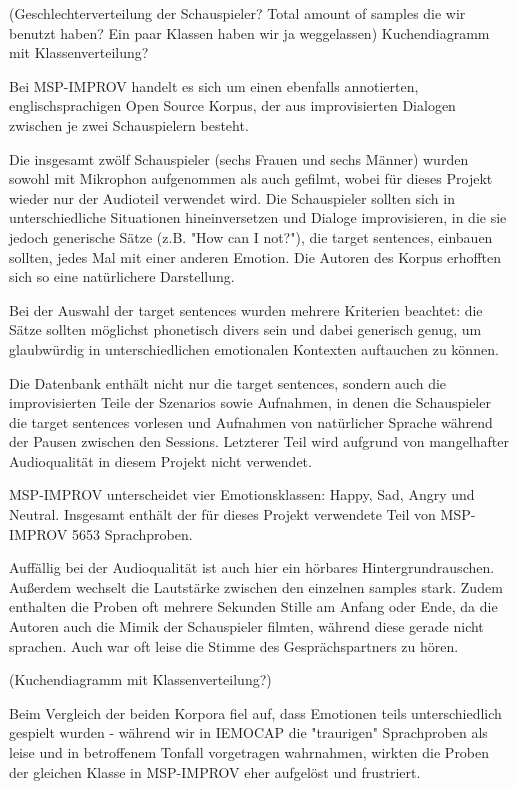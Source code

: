 \documentclass{article} %
\begin{document}
(Geschlechterverteilung der Schauspieler? Total amount of samples die wir benutzt haben? Ein paar Klassen haben wir ja weggelassen)
Kuchendiagramm mit Klassenverteilung?



Bei MSP-IMPROV handelt es sich um einen ebenfalls annotierten, englischsprachigen Open Source Korpus, der aus improvisierten Dialogen zwischen je zwei Schauspielern besteht. 

Die insgesamt zwölf Schauspieler (sechs Frauen und sechs Männer) wurden sowohl mit Mikrophon aufgenommen als auch gefilmt, wobei für dieses Projekt wieder nur der Audioteil verwendet wird. Die Schauspieler sollten sich in unterschiedliche Situationen hineinversetzen und Dialoge improvisieren, in die sie jedoch generische Sätze (z.B. "How can I not?"), die target sentences, einbauen sollten, jedes Mal mit einer anderen Emotion. Die Autoren des Korpus erhofften sich so eine natürlichere Darstellung. 

Bei der Auswahl der target sentences wurden mehrere Kriterien beachtet: die Sätze sollten möglichst phonetisch divers sein und dabei generisch genug, um glaubwürdig in unterschiedlichen emotionalen Kontexten auftauchen zu können. 

Die Datenbank enthält nicht nur die target sentences, sondern auch die improvisierten Teile der Szenarios sowie Aufnahmen, in denen die Schauspieler die target sentences vorlesen und Aufnahmen von natürlicher Sprache während der Pausen zwischen den Sessions. Letzterer Teil wird aufgrund von mangelhafter Audioqualität in diesem Projekt nicht verwendet. 

MSP-IMPROV unterscheidet vier Emotionsklassen: Happy, Sad, Angry und Neutral. Insgesamt enthält der für dieses Projekt verwendete Teil von MSP-IMPROV 5653 Sprachproben. 

Auffällig bei der Audioqualität ist auch hier ein hörbares Hintergrundrauschen. Außerdem wechselt die Lautstärke zwischen den einzelnen samples stark. Zudem enthalten die Proben oft mehrere Sekunden Stille am Anfang oder Ende, da die Autoren auch die Mimik der Schauspieler filmten, während diese gerade nicht sprachen. Auch war oft leise die Stimme des Gesprächspartners zu hören. 

(Kuchendiagramm mit Klassenverteilung?)


Beim Vergleich der beiden Korpora fiel auf, dass Emotionen teils unterschiedlich gespielt wurden - während wir in IEMOCAP die "traurigen" Sprachproben als leise und in betroffenem Tonfall vorgetragen wahrnahmen, wirkten die Proben der gleichen Klasse in MSP-IMPROV eher aufgelöst und frustriert. 
\end{document}
